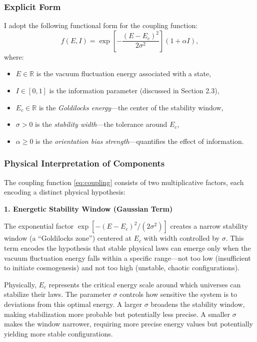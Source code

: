 \documentclass[12pt,a4paper]{article}
\theoremstyle{definition}
\theoremstyle{remark}
\begin{document}
\subsubsection{Explicit Form}

I adopt the following functional form for the coupling function:
\begin{equation}\label{eq:coupling}
f(E,I) = \exp\left[-\frac{(E - E_c)^2}{2\sigma^2}\right] (1 + \alpha I),
\end{equation}
where:
\begin{itemize}
\item $E \in \mathbb{R}$ is the vacuum fluctuation energy associated with a state,
\item $I \in [0,1]$ is the information parameter (discussed in Section 2.3),
\item $E_c \in \mathbb{R}$ is the \emph{Goldilocks energy}—the center of the stability window,
\item $\sigma > 0$ is the \emph{stability width}—the tolerance around $E_c$,
\item $\alpha \geq 0$ is the \emph{orientation bias strength}—quantifies the effect of information.
\end{itemize}

\subsubsection{Physical Interpretation of Components}

The coupling function \eqref{eq:coupling} consists of two multiplicative factors, each encoding a distinct physical hypothesis:

\textbf{1. Energetic Stability Window (Gaussian Term)}

The exponential factor $\exp[-(E - E_c)^2/(2\sigma^2)]$ creates a narrow stability window (a ``Goldilocks zone'') centered at $E_c$ with width controlled by $\sigma$. This term encodes the hypothesis that stable physical laws can emerge only when the vacuum fluctuation energy falls within a specific range—not too low (insufficient to initiate cosmogenesis) and not too high (unstable, chaotic configurations).

Physically, $E_c$ represents the critical energy scale around which universes can stabilize their laws. The parameter $\sigma$ controls how sensitive the system is to deviations from this optimal energy. A larger $\sigma$ broadens the stability window, making stabilization more probable but potentially less precise. A smaller $\sigma$ makes the window narrower, requiring more precise energy values but potentially yielding more stable configurations.
\end{document}
